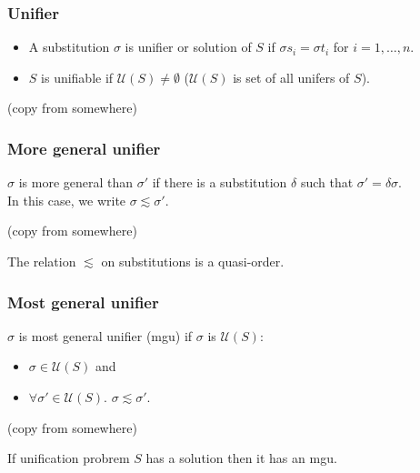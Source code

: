 \documentclass[aspectratio=169,12pt]{beamer}
\begin{document}
  \begin{frame}
    \frametitle{Unifier}
    \begin{definition}
      \begin{itemize}
        \item  A substitution $\sigma$ is \alert{unifier} or \alert{solution} of $S$ if $\sigma s_i = \sigma t_i$ for $i = 1, \ldots, n.$
        \item $S$ is \alert{unifiable} if $\mathcal{U}(S) \ne \emptyset$ \quad ($\mathcal{U}(S)$ is set of all unifers of $S$).
      \end{itemize}
    \end{definition}
    \begin{example}
      (copy from somewhere)
    \end{example}
  \end{frame}

  \begin{frame}
    \frametitle{More general unifier}
    \begin{definition}
      $\sigma$ is more general than $\sigma'$ if there is a substitution $\delta$ such that $\sigma' = \delta\sigma$. \\
      In this case, we write $\sigma \lesssim \sigma'$.
    \end{definition}
    \begin{example}
      (copy from somewhere)
    \end{example}
    \begin{lemma}
      The relation $\lesssim$ on substitutions is a quasi-order.
    \end{lemma}
  \end{frame}

  \begin{frame}
    \frametitle{Most general unifier}
    \begin{definition}
      $\sigma$ is most general unifier (mgu) if $\sigma$ is $\mathcal{U}(S)$:
      \begin{itemize}
        \item $\sigma \in \mathcal{U}(S)$ and
        \item $\forall\sigma' \in \mathcal{U}(S)$.  $\sigma \lesssim \sigma'$.
      \end{itemize}
    \end{definition}
    \begin{example}
      (copy from somewhere)
    \end{example}
    \begin{theorem}
      If unification probrem \textit{$S$} has a solution then it has an mgu.
    \end{theorem}
  \end{frame}

  \begin{frame}

  \end{frame}
\end{document}
